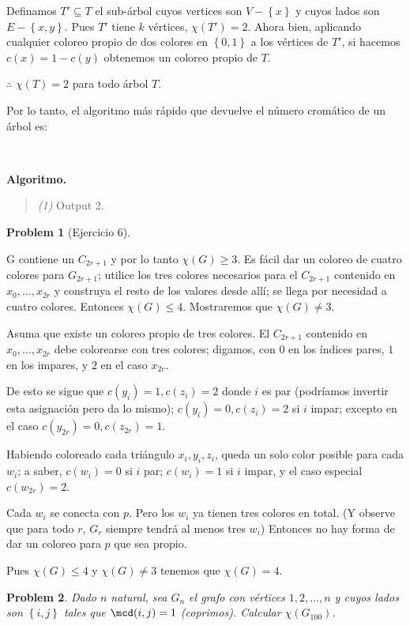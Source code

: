\documentclass[a4paper, 12pt]{article}
\newtheorem{problem}{Problem}
\newtheorem{problem}{Problem}
\begin{document}
Definamos $T' \subseteq T$ el sub-árbol cuyos vertices son $V - \left\{ x
\right\} $ y cuyos lados son $E - \left\{ x, y \right\} $. Pues $T'$ tiene $k$
vértices, $\chi(T') = 2$. Ahora bien, aplicando cualquier coloreo propio de dos
colores en $\left\{ 0, 1 \right\} $ a los vértices de $T'$, si hacemos $c(x) = 1
- c(y)$ obtenemos un coloreo propio de $T$. 

$\therefore $ $\chi(T) = 2$ para todo árbol $T$.

Por lo tanto, el algoritmo más rápido que devuelve el número cromático de un
árbol es:

~

\textbf{Algoritmo.} 
\begin{quote}
    \textit{(1)} Output 2.
\end{quote}

\pagebreak

\begin{problem}[Ejercicio 6]
\end{problem} 

G contiene un $C_{2r + 1}$ y por lo tanto $\chi(G) \geq 3$. Es fácil dar un
coloreo de cuatro colores para $G_{2r+1}$; utilice los tres colores necesarios
para el $C_{2r+1}$ contenido en $x_0, \ldots, x_{2r}$ y construya el resto de
los valores desde allí; se llega por necesidad a cuatro colores. Entonces
$\chi(G) \leq 4$. Mostraremos que $\chi(G) \neq 3$.

Asuma que existe un coloreo propio de tres colores. El $C_{2r+1}$ contenido en
$x_0, \ldots, x_{2r}$ debe colorearse con tres colores; digamos, con $0$ en los
índices pares, $1$ en los impares, y $2$ en el caso $x_{2r}$.

De esto se sigue que $c(y_i) = 1, c(z_i) = 2$ donde $i$ es par (podríamos
invertir esta asignación pero da lo mismo); $c(y_i) = 0, c(z_i) = 2$ si $i$
impar; excepto en el caso $c(y_{2r}) = 0, c(z_{2r}) = 1$.

Habiendo coloreado cada triángulo $x_i, y_i, z_i$, queda un solo color posible
para cada $w_i$; a saber, $c(w_i) = 0$ si $i$ par; $c(w_i) = 1$ si $i$ impar, y
el caso especial $c(w_{2r}) = 2$.

Cada $w_i$ se conecta con $p$. Pero los $w_i$ ya tienen tres colores en total.
(Y observe que para todo $r$, $G_r$ siempre tendrá al menos tres $w_i$) Entonces
no hay forma de dar un coloreo para $p$ que sea propio.

Pues $\chi(G) \leq 4$ y $\chi(G) \neq 3$ tenemos que $\chi(G) = 4$.
\pagebreak
\begin{problem}
    Dado $n$ natural, sea $G_n$ el grafo con vértices $1, 2, \ldots, n$ y cuyos
    lados son $\left\{ i, j \right\} $ tales que $\mcd(i, j) = 1$ (coprimos).
    Calcular $\chi(G_{100})$.
\end{problem}
\end{document}
